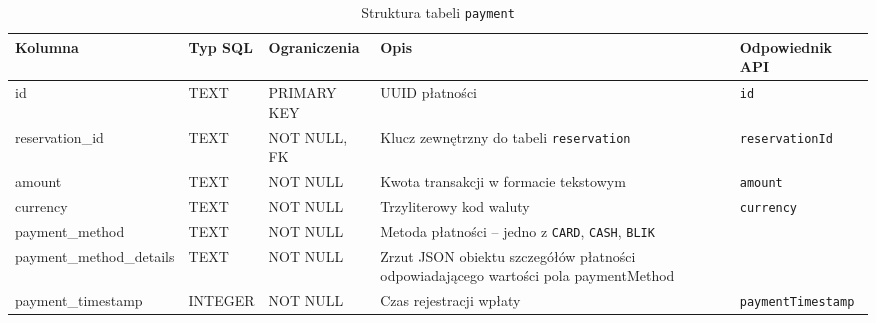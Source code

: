 \documentclass[11pt]{article}
\begin{document}
\begin{table}[H]
  \centering
  \renewcommand{\arraystretch}{1.3}
  \begin{tabularx}{\textwidth}{|l|l|l|X|l|}
    \hline
    \textbf{Kolumna} & \textbf{Typ SQL} & \textbf{Ograniczenia} & \textbf{Opis} & \textbf{Odpowiednik API} \\
    \hline
    id & TEXT & PRIMARY KEY & UUID płatności & \texttt{id} \\
    \hline
    reservation\_id & TEXT & NOT NULL, FK & Klucz zewnętrzny do tabeli \texttt{reservation} & \texttt{reservationId} \\
    \hline
    amount & TEXT & NOT NULL & Kwota transakcji w formacie tekstowym & \texttt{amount} \\
    \hline
    currency & TEXT & NOT NULL & Trzyliterowy kod waluty & \texttt{currency} \\
    \hline
    payment\_method & TEXT & NOT NULL & Metoda płatności -- jedno z \texttt{CARD}, \texttt{CASH}, \texttt{BLIK} \\
    \hline
    payment\_method\_details & TEXT & NOT NULL & Zrzut JSON obiektu szczegółów płatności odpowiadającego wartości pola paymentMethod \\
    \hline
    payment\_timestamp & INTEGER & NOT NULL & Czas rejestracji wpłaty & \texttt{paymentTimestamp} \\
    \hline
  \end{tabularx}
  \caption{Struktura tabeli \texttt{payment}}
  \label{tab:schema-payment}
\end{table}
\end{document}
